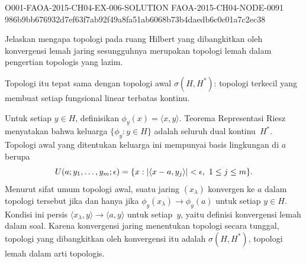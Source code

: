 \begin{o001solution}
  {O001-FAOA-2015-CH04-EX-006-SOLUTION}
  {FAOA-2015-CH04-NODE-0091}
  {986b9bb676932d7ef63f7ab92f49a8fa51ab6068b73b4daedb6c0c01a7c2ec38}
\begin{o001statement}
Jelaskan mengapa topologi pada ruang Hilbert yang dibangkitkan oleh konvergensi lemah jaring sesungguhnya merupakan
topologi lemah dalam pengertian topologis yang lazim.
\end{o001statement}
\begin{o001answer}
Topologi itu tepat sama dengan topologi awal
$\sigma(H,H^*)$: topologi terkecil yang membuat setiap fungsional linear
terbatas kontinu.
\end{o001answer}
\begin{o001proof}
Untuk setiap $y\in H$, definisikan $\phi_y(x)=\langle x,y\rangle$. Teorema
Representasi Riesz menyatakan bahwa keluarga $\{\phi_y:y\in H\}$ adalah
seluruh dual kontinu~$H^*$. Topologi awal yang ditentukan keluarga ini
mempunyai basis lingkungan di $a$ berupa
\[
 U(a;y_1,\ldots,y_m;\epsilon)
 =\{x:\lvert\langle x-a,y_j\rangle\rvert<\epsilon,
             \ 1\leq j\leq m\}.
\]
Menurut sifat umum topologi awal, suatu jaring $(x_\lambda)$ konvergen ke
$a$ dalam topologi tersebut jika dan hanya jika
$\phi_y(x_\lambda)\to\phi_y(a)$ untuk setiap $y\in H$. Kondisi ini persis
$\langle x_\lambda,y\rangle\to\langle a,y\rangle$ untuk setiap~$y$, yaitu
definisi konvergensi lemah dalam soal. Karena konvergensi jaring menentukan
topologi secara tunggal, topologi yang dibangkitkan oleh konvergensi itu
adalah $\sigma(H,H^*)$, topologi lemah dalam arti topologis.
\end{o001proof}
\end{o001solution}

